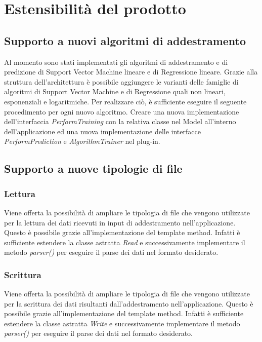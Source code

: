 \section{Estensibilità del prodotto}
	\subsection{Supporto a nuovi algoritmi di addestramento}
	Al momento sono stati implementati gli algoritmi di addestramento e di predizione di Support Vector Machine lineare e di Regressione lineare. Grazie alla struttura dell'architettura è possibile aggiungere le varianti delle famiglie di algoritmi di Support Vector Machine e di Regressione quali non lineari, esponenziali e logaritmiche.
	Per realizzare ciò, è sufficiente eseguire il seguente procedimento per ogni nuovo algoritmo. Creare una nuova implementazione dell'interfaccia \textit{PerformTraining} con la relativa classe nel Model all'interno dell'applicazione ed una nuova implementazione delle interfacce \textit{PerformPrediction} e \textit{AlgorithmTrainer} nel plug-in.
	\subsection{Supporto a nuove tipologie di file}
		\subsubsection{Lettura}
		Viene offerta la possibilità di ampliare le tipologia di file che vengono utilizzate per la lettura dei dati ricevuti in input di addestramento nell'applicazione. Questo è possibile grazie all'implementazione del template method. Infatti è sufficiente estendere la classe astratta \textit{Read} e successivamente implementare il metodo \textit{parser()} per eseguire il parse dei dati nel formato desiderato.
		\subsubsection{Scrittura}
		Viene offerta la possibilità di ampliare le tipologia di file che vengono utilizzate per la scrittura dei dati risultanti dall'addestramento nell'applicazione. Questo è possibile grazie all'implementazione del template method. Infatti è sufficiente estendere la classe astratta \textit{Write} e successivamente implementare il metodo \textit{parser()} per eseguire il parse dei dati nel formato desiderato.